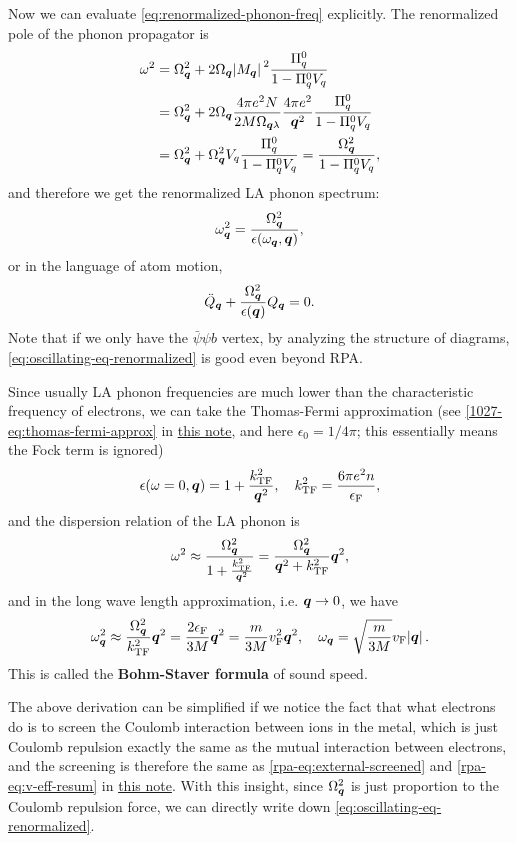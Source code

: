\documentclass[hyperref, a4paper]{article}
\newcommand*{\concept}[1]{{\textbf{#1}}}
\newcommand{\rpanote}{\href{./electron-gas.pdf}{this note}}
\newcommand{\advancedelenote}{\href{../advanced-electrodynamics/lecture-10-27.pdf}{this note}}
\begin{document}
Now we can evaluate \eqref{eq:renormalized-phonon-freq} explicitly. The renormalized pole of the phonon propagator is 
\[
    \begin{aligned}
        \omega^2 &= \Omega^2_{\vb*{q}} + 2 \Omega_{\vb*{q}} \abs*{M_{\vb*{q}}}^2 \frac{\Pi^0_q}{1 - \Pi^0_q V_q} \\
        &= \Omega^2_{\vb*{q}} + 2 \Omega_{\vb*{q}} \frac{4 \pi e^2 N}{2M \Omega_{\vb*{q} \lambda}} \frac{4 \pi e^2}{\vb*{q}^2} \frac{\Pi^0_q}{1 - \Pi^0_q V_q}  \\
        &= \Omega^2_{\vb*{q}} + \Omega^2_{\vb*{q}} V_q \frac{\Pi^0_q}{1 - \Pi^0_q V_q} = \frac{\Omega^2_{\vb*{q}}}{1 - \Pi^0_q V_q},
    \end{aligned}
\]
and therefore we get the renormalized LA phonon spectrum:
\begin{equation}
    \omega_{\vb*{q}}^2 = \frac{\Omega_{\vb*{q}}^2}{\epsilon(\omega_{\vb*{q}}, \vb*{q})} ,
\end{equation}
or in the language of atom motion, 
\begin{equation}
    \ddot{Q}_{\vb*{q}} + \frac{\Omega_{\vb*{q}}^2}{\epsilon(\vb*{q})} Q_{\vb*{q}} = 0.
    \label{eq:oscillating-eq-renormalized}
\end{equation}
Note that if we only have the $\bar{\psi} \psi b$ vertex,
by analyzing the structure of diagrams,
\eqref{eq:oscillating-eq-renormalized} is good even beyond RPA.

Since usually LA phonon frequencies are much lower than the characteristic frequency of electrons, we can take 
the Thomas-Fermi approximation (see \eqref{1027-eq:thomas-fermi-approx} in \advancedelenote, and here $\epsilon_0 = 1 / 4 \pi$; this essentially means the Fock term is ignored)
\begin{equation}
    \epsilon(\omega=0, \vb*{q}) = 1 + \frac{k_\text{TF}^2}{\vb*{q}^2}, \quad k_\text{TF}^2 = \frac{6 \pi e^2 n}{\epsilon_\text{F}},
\end{equation}
and the dispersion relation of the LA phonon is 
\[
    \omega^2 \approx \frac{\Omega^2_{\vb*{q}}}{1 + \frac{k_\text{TF}^2}{\vb*{q}^2}} = \frac{\Omega^2_{\vb*{q}}}{\vb*{q}^2 + k_\text{TF}^2} \vb*{q}^2,
\] 
and in the long wave length approximation, i.e. $\vb*{q} \to 0$, we have 
\begin{equation}
    \omega_{\vb*{q}}^2 \approx \frac{\Omega^2_{\vb*{q}}}{k_\text{TF}^2} \vb*{q}^2 = \frac{2 \epsilon_\text{F}}{3M} \vb*{q}^2 = \frac{m}{3 M} v_\text{F}^2 \vb*{q}^2, \quad \omega_{\vb*{q}} = \sqrt{\frac{m}{3M}} v_\text{F} \abs*{\vb*{q}}. 
\end{equation}
This is called the \concept{Bohm-Staver formula} of sound speed.

The above derivation can be simplified if we notice the fact that what electrons do is to screen the Coulomb 
interaction between ions in the metal, which is just Coulomb repulsion exactly the same as the mutual 
interaction between electrons, and the screening is therefore the same as \eqref{rpa-eq:external-screened} 
and  \eqref{rpa-eq:v-eff-resum} in \rpanote. 
With this insight, since $\Omega_{\vb*{q}}^2$ is just proportion to 
the Coulomb repulsion force, we can directly write down \eqref{eq:oscillating-eq-renormalized}. 
\end{document}
